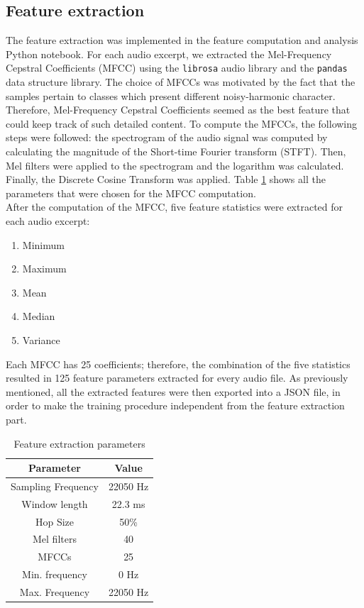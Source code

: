 \documentclass{article}
\newcommand{\code}{\texttt}
\begin{document}
\subsection{Feature extraction}
The feature extraction was implemented in the feature computation and analysis Python notebook. For each audio excerpt, we extracted the Mel-Frequency Cepstral Coefficients (MFCC) using the \code{librosa} audio library \cite{librosa} and the \code{pandas} data structure \cite{pandas} library. The choice of MFCCs was motivated by the fact that the samples pertain to classes which present different noisy-harmonic character. Therefore, Mel-Frequency Cepstral Coefficients seemed as the best feature that could keep track of such detailed content. 
To compute the MFCCs, the following steps were followed: the spectrogram of the audio signal was computed by calculating the magnitude of the Short-time Fourier transform (STFT). Then, Mel filters were applied to the spectrogram and the logarithm was calculated. Finally, the Discrete Cosine Transform was applied. Table \ref{tab::MFCC_parameters} shows all the parameters that were chosen for the MFCC computation.\\
After the computation of the MFCC, five feature statistics were extracted for each audio excerpt:
\begin{enumerate}[itemsep=0em]
    \item Minimum
    \item Maximum
    \item Mean
    \item Median
    \item Variance
\end{enumerate}
Each MFCC has 25 coefficients; therefore, the combination of the five statistics resulted in 125 feature parameters extracted for every audio file. As previously mentioned, all the extracted features were then exported into a JSON file, in order to make the training procedure independent from the feature extraction part.

\begin{table}[ht]
\centering
\begin{tabular}{|c|c|}
\hline
\textbf{Parameter} & \textbf{Value}        \\ \hline
Sampling Frequency & 22050 Hz              \\ \hline
Window length   & 22.3 ms               \\ \hline
Hop Size           & 50\%                  \\ \hline
Mel filters        & 40                    \\ \hline
MFCCs              & 25                    \\ \hline
Min. frequency     & 0 Hz                  \\ \hline
Max. Frequency     & 22050 Hz              \\ \hline
\end{tabular}
\caption{Feature extraction parameters}
\label{tab::MFCC_parameters}
\end{table}
\end{document}
